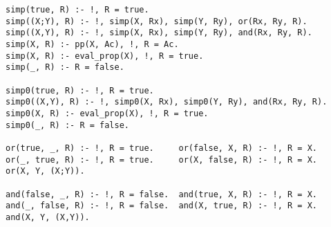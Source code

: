\documentclass{llncs}
\begin{document}
{\begin{verbatim}
simp(true, R) :- !, R = true.
simp((X;Y), R) :- !, simp(X, Rx), simp(Y, Ry), or(Rx, Ry, R).
simp((X,Y), R) :- !, simp(X, Rx), simp(Y, Ry), and(Rx, Ry, R).
simp(X, R) :- pp(X, Ac), !, R = Ac.
simp(X, R) :- eval_prop(X), !, R = true.
simp(_, R) :- R = false.

simp0(true, R) :- !, R = true.
simp0((X,Y), R) :- !, simp0(X, Rx), simp0(Y, Ry), and(Rx, Ry, R).
simp0(X, R) :- eval_prop(X), !, R = true.
simp0(_, R) :- R = false.

or(true, _, R) :- !, R = true.     or(false, X, R) :- !, R = X.
or(_, true, R) :- !, R = true.     or(X, false, R) :- !, R = X.
or(X, Y, (X;Y)).

and(false, _, R) :- !, R = false.  and(true, X, R) :- !, R = X.
and(_, false, R) :- !, R = false.  and(X, true, R) :- !, R = X.
and(X, Y, (X,Y)).
\end{verbatim}
}
\end{document}
